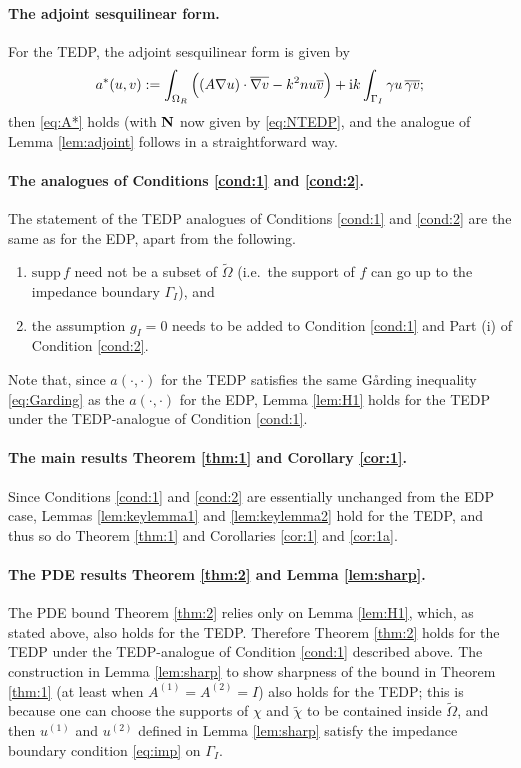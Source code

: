 \documentclass[10pt]{article}%
\numberwithin{equation}{section}
\newcommand{\beq}{\begin{equation}}
\newcommand{\eeq}{\end{equation}}
\newcommand{\ben}{\begin{enumerate}}
\newcommand{\een}{\end{enumerate}}
\newcommand{\supp}{\mathrm{supp}}
\newcommand{\ri}{{\rm i}}
\newcommand{\gu}{\nabla u}
\newcommand{\gvb}{\overline{\nabla v}}
\newcommand{\vb}{\overline{v}}
\newcommand{\domain}{\Omega}
\newcommand{\matrixN}{{\bf N}}
\newcommand{\coeffA}{A}
\newcommand{\coeffn}{n}
\newcommand{\coeffAo}{A^{(1)}}
\newcommand{\coeffAt}{A^{(2)}}
\begin{document}
\paragraph{The adjoint sesquilinear form.} For the TEDP, the adjoint sesquilinear form is given by 
\beq\label{eq:TEDPadjoint}
a^*(u,v) := \int_{\domain_R} 
\Big((\coeffA \gu)\cdot\gvb
 - k^2 \coeffn u\vb\Big) +\ri k\int_{\Gamma_I} \gamma u\, \overline{\gamma v};
\eeq
then \eqref{eq:A*} holds (with $\matrixN$ now given by \eqref{eq:NTEDP}, and the analogue of Lemma \ref{lem:adjoint} follows in a straightforward way.


\paragraph{The analogues of Conditions \ref{cond:1} and \ref{cond:2}.}
The statement of the TEDP analogues of Conditions \ref{cond:1} and \ref{cond:2} are the same as for the EDP, apart from the following.
\ben
\item
$\supp \,f$ need not be a subset of $\widetilde{\Omega}$ (i.e.~the support of $f$ can go up to the impedance boundary $\Gamma_I$), and
\item the assumption $g_I= 0$ needs to be added to Condition \ref{cond:1} and Part (i) of Condition \ref{cond:2}.
\een
 Note that, since $a(\cdot,\cdot)$ for the TEDP satisfies the same G\aa rding inequality \eqref{eq:Garding} as the $a(\cdot,\cdot)$ for the EDP, Lemma \ref{lem:H1} holds for the TEDP under the TEDP-analogue of Condition \ref{cond:1}.

\paragraph{The main results Theorem \ref{thm:1} and Corollary \ref{cor:1}.}
Since Conditions \ref{cond:1} and \ref{cond:2} are essentially unchanged from the EDP case, Lemmas \ref{lem:keylemma1} and \ref{lem:keylemma2} hold for the TEDP, and thus so do Theorem \ref{thm:1} and Corollaries \ref{cor:1} and \ref{cor:1a}.

\paragraph{The PDE results Theorem \ref{thm:2} and Lemma \ref{lem:sharp}.}

The PDE bound Theorem \ref{thm:2} relies only on Lemma \ref{lem:H1}, which, as stated above, also holds for the TEDP. Therefore Theorem \ref{thm:2} holds for the TEDP under the TEDP-analogue of Condition \ref{cond:1} described above. The construction in Lemma \ref{lem:sharp} to show sharpness of the bound in Theorem \ref{thm:1} (at least when $\coeffAo= \coeffAt= I$) also holds for the TEDP; this is because one can choose the supports of $\chi$ and $\widetilde{\chi}$ to be contained inside $\widetilde{\Omega}$, and then $u^{(1)}$ and $u^{(2)}$ defined in Lemma \ref{lem:sharp} satisfy the impedance boundary condition \eqref{eq:imp} on $\Gamma_I$.
\end{document}
